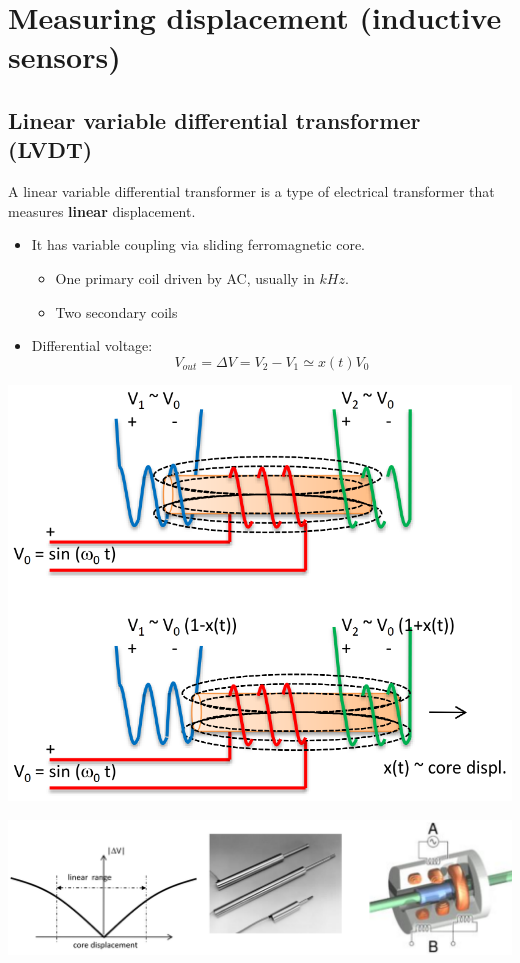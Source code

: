 \documentclass[11pt]{article}
\begin{document}
 \newpage
\section{Measuring displacement (inductive sensors)}
\label{sec:org1b99dc7}

\subsection{Linear variable differential transformer (LVDT)}
\label{sec:orgb03a681}
A linear variable differential transformer is a type of electrical transformer that measures \textbf{linear} displacement.
\begin{itemize}
\item It has variable coupling via sliding ferromagnetic core.
\begin{itemize}
\item One primary coil driven by AC, usually in \(\unit{kHz}\).
\item Two secondary coils
\end{itemize}
\item Differential voltage:
\[V_{out} = \Delta V = V_2 - V_1 \simeq x(t) V_0\]
\end{itemize}

\begin{center}
\includegraphics[width=.9\linewidth]{./images/linear-variable-differential-transformer-working-principle.png}
\end{center}

\begin{center}
\includegraphics[width=.9\linewidth]{./images/linear-variable-differential-transformer-images-and-graph.png}
\end{center}
\end{document}
